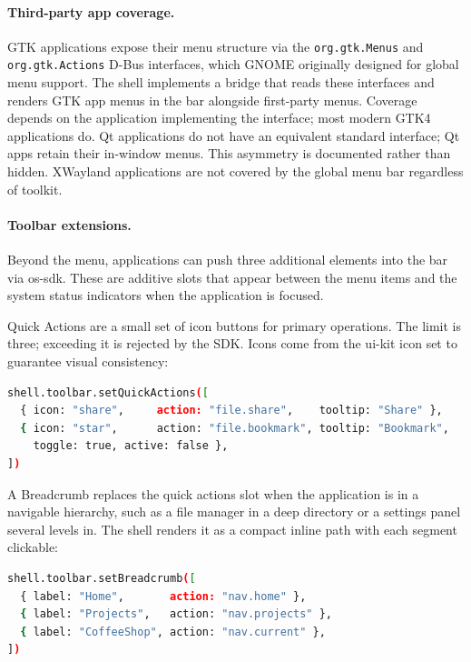 \paragraph{Third-party app coverage.}
GTK applications expose their menu structure via the
\texttt{org.gtk.Menus} and \texttt{org.gtk.Actions} D-Bus interfaces, which
GNOME originally designed for global menu support. The shell implements a
bridge that reads these interfaces and renders GTK app menus in the bar
alongside first-party menus. Coverage depends on the application implementing
the interface; most modern GTK4 applications do. Qt applications do not have
an equivalent standard interface; Qt apps retain their in-window menus. This
asymmetry is documented rather than hidden. XWayland applications are not
covered by the global menu bar regardless of toolkit.

\paragraph{Toolbar extensions.}
Beyond the menu, applications can push three additional elements into the bar
via os-sdk. These are additive slots that appear between the menu items and
the system status indicators when the application is focused.

Quick Actions are a small set of icon buttons for primary operations. The
limit is three; exceeding it is rejected by the SDK. Icons come from the
ui-kit icon set to guarantee visual consistency:

\begin{lstlisting}[language=bash, caption={Quick Actions registration}]
shell.toolbar.setQuickActions([
  { icon: "share",     action: "file.share",    tooltip: "Share" },
  { icon: "star",      action: "file.bookmark", tooltip: "Bookmark",
    toggle: true, active: false },
])
\end{lstlisting}

A Breadcrumb replaces the quick actions slot when the application is in a
navigable hierarchy, such as a file manager in a deep directory or a settings panel
several levels in. The shell renders it as a compact inline path with each
segment clickable:

\begin{lstlisting}[language=bash, caption={Breadcrumb registration}]
shell.toolbar.setBreadcrumb([
  { label: "Home",       action: "nav.home" },
  { label: "Projects",   action: "nav.projects" },
  { label: "CoffeeShop", action: "nav.current" },
])
\end{lstlisting}


